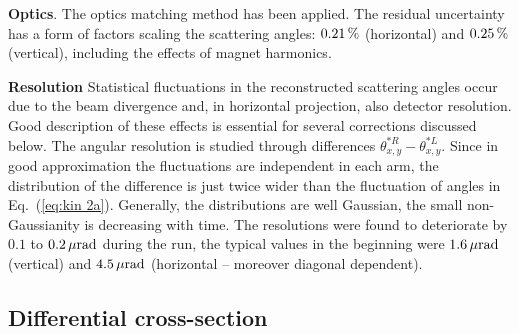 \documentclass[twocolumn,a4paper,superscriptaddress,preprintnumbers,showpacs,nofootinbib]{revtex4-1}
\def\un#1{\,{\rm #1}}
\begin{document}
{\bf Optics}. The optics matching method \cite{totem-optics} has been applied. The residual uncertainty has a form of factors scaling the scattering angles: %
$0.21\un{\%}$ (horizontal) and $0.25\un{\%}$ (vertical), including the effects of magnet harmonics.

{\bf Resolution} Statistical fluctuations in the reconstructed scattering angles occur due to the beam divergence and, in horizontal projection, also detector resolution. Good description of these effects is essential for several corrections discussed below. The angular resolution is studied through differences $\theta_{x,y}^{*R} - \theta_{x,y}^{*L}$. Since in good approximation the fluctuations are independent in each arm, the distribution of the difference is just twice wider than the fluctuation of angles in Eq.~(\ref{eq:kin 2a}). Generally, the distributions are well Gaussian, the small non-Gaussianity is decreasing with time. The resolutions were found to deteriorate by $0.1$ to $0.2\un{\mu rad}$ during the run, the typical values in the beginning were $1.6\un{\mu rad}$ (vertical) and $4.5\un{\mu rad}$ (horizontal -- moreover diagonal dependent).

\subsection{Differential cross-section}
\end{document}
